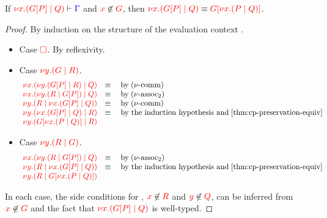 \begin{lemma}\label{thm:cp-display}
  If $\seq[{ \tm{\cpCut{x}{\cpPlug{G}{P}}{Q}} }]{ \Gamma }$ and
  $\notFreeIn{x}{G}$, then $\tm{\cpCut{x}{\cpPlug{G}{P}}{Q}} \equiv
  \tm{\cpPlug{G}{\cpCut{x}{P}{Q}}}$. 
\end{lemma}
\begin{proof}
  By induction on the structure of the evaluation context .
  \begin{itemize}
  \item
    Case $\tm{\Box}$. By reflexivity.
  \item
    Case $\tm{\cpCut{y}{G}{R}}$.
    \[\!
      \begin{array}{ll}
        \tm{\cpCut{x}{\cpCut{y}{\cpPlug{G}{P}}{R}}{Q}} & \equiv \quad \text{by} \; \cpEquivCutComm\\
        \tm{\cpCut{x}{\cpCut{y}{R}{\cpPlug{G}{P}}}{Q}} & \equiv \quad \text{by} \; \cpEquivCutAss2 \\
        \tm{\cpCut{y}{R}{\cpCut{x}{\cpPlug{G}{P}}{Q}}} & \equiv \quad \text{by} \; \cpEquivCutComm \\
        \tm{\cpCut{y}{\cpCut{x}{\cpPlug{G}{P}}{Q}}{R}} & \equiv \quad \text{by the induction hypothesis and} \; \cref{thm:cp-preservation-equiv}\\
        \tm{\cpCut{y}{\cpPlug{G}{\cpCut{x}{P}{Q}}}{R}} &
      \end{array}
    \]
  \item
    Case $\tm{\cpCut{y}{R}{G}}$.
    \[\!
      \begin{array}{ll}
        \tm{\cpCut{x}{\cpCut{y}{R}{\cpPlug{G}{P}}}{Q}} & \equiv \quad \text{by} \; \cpEquivCutAss2\\
        \tm{\cpCut{y}{R}{\cpCut{x}{\cpPlug{G}{P}}{Q}}} & \equiv \quad \text{by the induction hypothesis and} \; \cref{thm:cp-preservation-equiv}\\
        \tm{\cpCut{y}{R}{\cpPlug{G}{\cpCut{x}{P}{Q}}}}
      \end{array}
    \]
  \end{itemize}
  In each case, the side conditions for , $\notFreeIn{x}{R}$ and
  $\notFreeIn{y}{Q}$, can be inferred from $\notFreeIn{x}{G}$ and the fact that
  $\tm{\cpCut{x}{\cpPlug{G}{P}}{Q}}$ is well-typed.
\end{proof}
